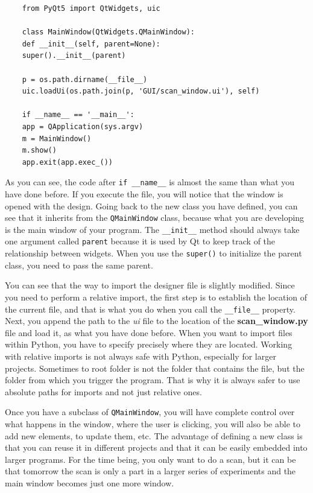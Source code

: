 \begin{verbatim}
    from PyQt5 import QtWidgets, uic

    class MainWindow(QtWidgets.QMainWindow):
    def __init__(self, parent=None):
    super().__init__(parent)

    p = os.path.dirname(__file__)
    uic.loadUi(os.path.join(p, 'GUI/scan_window.ui'), self)

    if __name__ == '__main__':
    app = QApplication(sys.argv)
    m = MainWindow()
    m.show()
    app.exit(app.exec_())
\end{verbatim}

As you can see, the code after \texttt{if __name__} is almost the
same than what you have done before. If you execute the file, you will
notice that the window is opened with the design. Going back to the new
class you have defined, you can see that it inherits from the
\texttt{QMainWindow} class, because what you are developing is the main
window of your program. The \texttt{__init__} method should always
take one argument called \texttt{parent} because it is used by Qt to
keep track of the relationship between widgets. When you use the
\texttt{super()} to initialize the parent class, you need to pass the
same parent.

You can see that the way to import the designer file is slightly
modified. Since you need to perform a relative import, the first step is
to establish the location of the current file, and that is what you do
when you call the \texttt{__file__} property. Next, you append the
path to the \emph{ui} file to the location of the
\textbf{scan\_window.py} file and load it, as what you have done before.
When you want to import files within Python, you have to specify
precisely where they are located. Working with relative imports is not
always safe with Python, especially for larger projects. Sometimes to
root folder is not the folder that contains the file, but the folder
from which you trigger the program. That is why it is always safer to
use absolute paths for imports and not just relative ones.

Once you have a subclass of \texttt{QMainWindow}, you will have complete
control over what happens in the window, where the user is clicking, you
will also be able to add new elements, to update them, etc. The advantage of defining a new class is that you can reuse it in different
projects and that it can be easily embedded into larger programs. For
the time being, you only want to do a scan, but it can be that tomorrow
the scan is only a part in a larger series of experiments and the main
window becomes just one more window.

